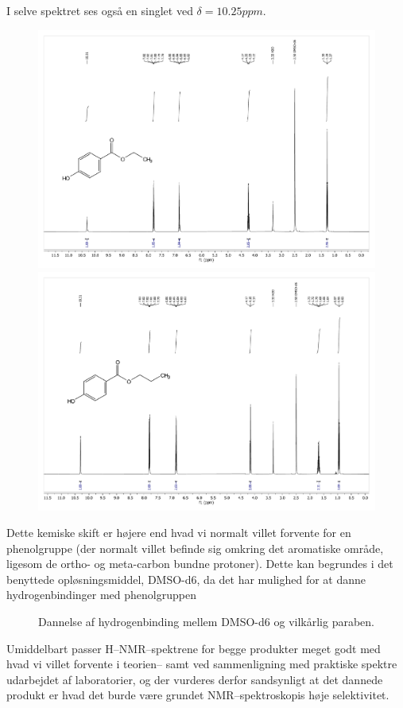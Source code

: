     I selve spektret ses også en singlet ved $\delta=10.25\si{ppm}$. 
    \begin{figure}[H]\centering
        \includegraphics[width=.48\textwidth,page=1]{bilag/ethylnmr}
        \includegraphics[width=.48\textwidth,page=1]{bilag/propylnmr}
    \end{figure}
    Dette kemiske skift er højere end hvad vi normalt villet forvente for en phenolgruppe (der normalt villet befinde sig omkring det aromatiske område, ligesom de ortho- og meta-carbon bundne protoner). Dette kan begrundes i det benyttede opløsningsmiddel, DMSO-d6, da det har mulighed for at danne hydrogenbindinger med phenolgruppen \parencite{Raym2007}
    \begin{figure}[H]\centering
        \caption{Dannelse af hydrogenbinding mellem DMSO-d6 og vilkårlig paraben.}
    \end{figure}
    Umiddelbart passer H--NMR--spektrene for begge produkter meget godt med hvad vi villet forvente i teorien-- samt ved sammenligning med praktiske spektre udarbejdet af laboratorier, og der vurderes derfor sandsynligt at det dannede produkt er hvad det burde være grundet NMR--spektroskopis høje selektivitet.
